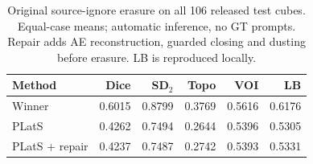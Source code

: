 \begin{table}[t]
\centering
\small
\setlength{\tabcolsep}{3pt}
\begin{tabular}{lrrrrr}
\toprule
Method & Dice & SD$_2$ & Topo & VOI & LB \\
\midrule
Winner & 0.6015 & 0.8799 & 0.3769 & 0.5616 & 0.6176 \\
PLatS & 0.4262 & 0.7494 & 0.2644 & 0.5396 & 0.5305 \\
PLatS + repair & 0.4237 & 0.7487 & 0.2742 & 0.5393 & 0.5331 \\
\bottomrule
\end{tabular}
\caption{Original source-ignore erasure on all 106 released test cubes. Equal-case means; automatic inference, no GT prompts. Repair adds AE reconstruction, guarded closing and dusting before erasure. LB is reproduced locally.}
\label{tab:lb}
\end{table}
